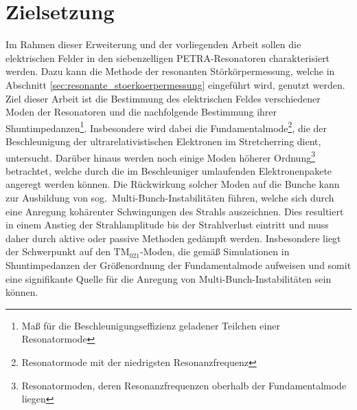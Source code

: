 \section{Zielsetzung}
Im Rahmen dieser Erweiterung und der vorliegenden Arbeit sollen die elektrischen Felder in den siebenzelligen PETRA-Resonatoren charakterisiert werden.
Dazu kann die Methode der resonanten Störkörpermessung, welche in Abschnitt \ref{sec:resonante_stoerkoerpermessung} eingeführt wird, genutzt werden.
Ziel dieser Arbeit ist die Bestimmung des elektrischen Feldes verschiedener Moden der Resonatoren und die nachfolgende Bestimmung ihrer Shuntimpedanzen\footnote{Maß für die Beschleunigungseffizienz geladener Teilchen einer Resonatormode}.
Insbesondere wird dabei die Fundamentalmode\footnote{Resonatormode mit der niedrigsten Resonanzfrequenz}, die der Beschleunigung der ultrarelativistischen Elektronen im Stretcherring dient, untersucht.
Darüber hinaus werden noch einige Moden höherer Ordnung\footnote{Resonatormoden, deren Resonanzfrequenzen oberhalb der Fun\-da\-men\-tal\-mode liegen} betrachtet, welche durch die im Beschleuniger umlaufenden Elektronenpakete angeregt werden können.
Die Rückwirkung solcher Moden auf die Bunche kann zur Ausbildung von sog.\ Multi-Bunch-Instabilitäten führen, welche sich durch eine Anregung kohärenter Schwingungen des Strahls auszeichnen.
Dies resultiert in einem Anstieg der Strahlamplitude bis der Strahlverlust eintritt und muss daher durch aktive oder passive Methoden gedämpft werden.
Insbesondere liegt der Schwerpunkt auf den $\mathrm{TM}_{021}$-Moden, die gemäß Simulationen in \cite{schedler} Shuntimpedanzen der Größenordnung der Fundamentalmode aufweisen und somit eine signifikante Quelle für die Anregung von Multi-Bunch-Instabilitäten sein können.
